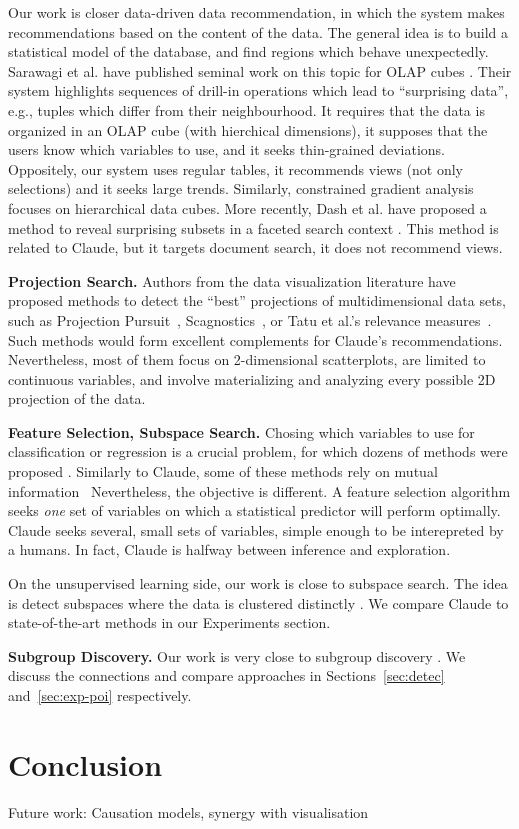 Our work is closer data-driven data recommendation, in which the system makes
recommendations based on the content of the data. The general idea is to build
a statistical model of the database, and find regions which behave
unexpectedly. Sarawagi et al. have published seminal work on this topic for
OLAP cubes \cite{sarawagi1998discovery}. Their system highlights sequences of
drill-in operations which lead to ``surprising data'', e.g., tuples which
differ from their neighbourhood. It requires that the data is organized in an
OLAP cube (with hierchical dimensions), it supposes that the users know which
variables to use, and it seeks thin-grained deviations. Oppositely, our system
uses regular tables, it recommends views (not only selections) and it seeks
large trends. Similarly, constrained gradient
analysis~\cite{imielinski2002cubegrades, dong2001mining} focuses on
hierarchical data cubes. More recently, Dash et al. have proposed a method to
reveal surprising subsets in a faceted search context \cite{dash2008dynamic}.
This method is related to Claude, but it targets document search, it does not
recommend views.

\textbf{Projection Search.} Authors from the data visualization literature have
proposed methods to detect the ``best'' projections of multidimensional data
sets, such as Projection Pursuit~\cite{yoi1974projection},
Scagnostics~\cite{wilkinson2005graph}, or Tatu et al.'s relevance
measures~\cite{tatu2011automated}. Such methods would form excellent complements
for Claude's recommendations. Nevertheless, most of them focus on 2-dimensional
scatterplots, are limited to continuous variables, and involve materializing
and analyzing every possible 2D projection of the data.

\textbf{Feature Selection, Subspace Search.} Chosing which variables to use for
classification or regression is a crucial problem, for which dozens of methods
were proposed \cite{guyon2003introduction}. Similarly to Claude, some of these
methods rely on mutual information~\cite{peng2005feature} Nevertheless, the
objective is different. A feature selection algorithm seeks \emph{one} set of
variables on which a statistical predictor will perform optimally. Claude seeks
several, small sets of variables, simple enough to be interepreted by a humans.
In fact, Claude is halfway between inference and exploration.

On the unsupervised learning side, our work is close to subspace search. The
idea is detect subspaces where the data is clustered distinctly
\cite{keller2012hics,nguyen20134s}. We compare Claude to state-of-the-art
methods in our Experiments section.

\textbf{Subgroup Discovery.} Our work is very close to subgroup discovery
\cite{klosgen1996explora, wrobel1997algorithm, van2011non}. We discuss the
connections and compare approaches in Sections~\ref{sec:detec}
and~\ref{sec:exp-poi} respectively.

\section{Conclusion}
\label{sec:conclusion}
Future work: Causation models, synergy with visualisation
